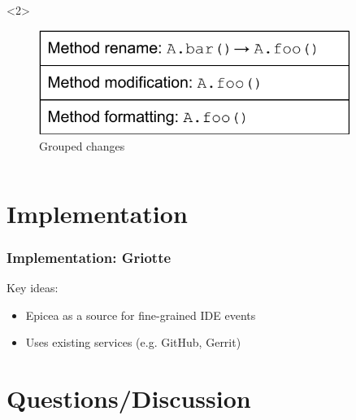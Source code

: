 \documentclass[aspectratio=169]{beamer}
\begin{document}
\begin{frame}[fragile]
\begin{columns}
\begin{column}{0.5\textwidth}
\begin{onlyenv}<2>
\begin{figure}
\begin{center}
\includegraphics[width=0.9\textwidth]{img/example_groups.pdf}
\end{center}
\caption{Grouped changes}
\end{figure}
\end{onlyenv}

\end{column}

\end{columns}

\end{frame}

\section{Implementation}

\begin{frame}[fragile]

\frametitle{Implementation: Griotte}

Key ideas:

\begin{itemize}
\item Epicea as a source for fine-grained IDE events
\item Uses existing services (e.g. GitHub, Gerrit)
\end{itemize}
\end{frame}

\section{Questions/Discussion}
\end{document}

